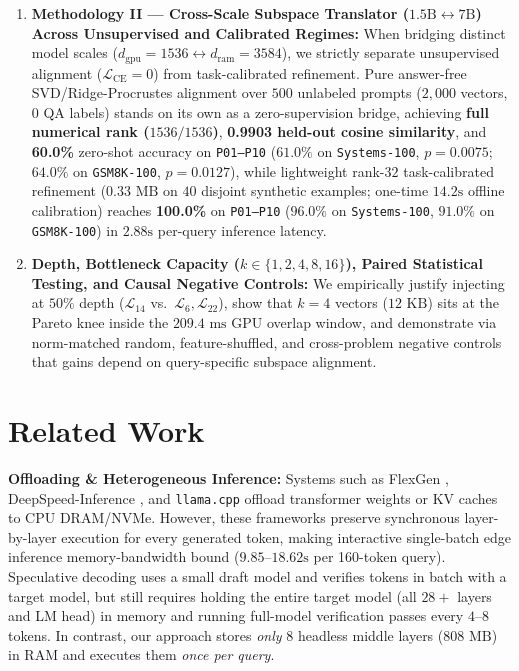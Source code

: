 \documentclass[10pt,twocolumn]{article}
\begin{document}
\begin{enumerate}
    \item \textbf{Methodology II --- Cross-Scale Subspace Translator ($1.5\text{B} \leftrightarrow 7\text{B}$) Across Unsupervised and Calibrated Regimes:} When bridging distinct model scales ($d_{\text{gpu}} = 1536 \leftrightarrow d_{\text{ram}} = 3584$), we strictly separate unsupervised alignment ($\mathcal{L}_{\text{CE}} = 0$) from task-calibrated refinement. Pure answer-free SVD/Ridge-Procrustes alignment over $500$ unlabeled prompts ($2,000$ vectors, $0$ QA labels) stands on its own as a zero-supervision bridge, achieving \textbf{full numerical rank ($1536/1536$)}, \textbf{0.9903 held-out cosine similarity}, and \textbf{60.0\%} zero-shot accuracy on \texttt{P01--P10} ($\mathbf{61.0\%}$ on \texttt{Systems-100}, $p=0.0075$; $\mathbf{64.0\%}$ on \texttt{GSM8K-100}, $p=0.0127$), while lightweight rank-$32$ task-calibrated refinement ($0.33\text{ MB}$ on $40$ disjoint synthetic examples; one-time $14.2\text{s}$ offline calibration) reaches \textbf{100.0\%} on \texttt{P01--P10} ($\mathbf{96.0\%}$ on \texttt{Systems-100}, $\mathbf{91.0\%}$ on \texttt{GSM8K-100}) in $2.88\text{s}$ per-query inference latency.
    \item \textbf{Depth, Bottleneck Capacity ($k \in \{1,2,4,8,16\}$), Paired Statistical Testing, and Causal Negative Controls:} We empirically justify injecting at $50\%$ depth ($\mathcal{L}_{14}$ vs.\ $\mathcal{L}_6, \mathcal{L}_{22}$), show that $k=4$ vectors ($12\text{ KB}$) sits at the Pareto knee inside the $209.4\text{ ms}$ GPU overlap window, and demonstrate via norm-matched random, feature-shuffled, and cross-problem negative controls that gains depend on query-specific subspace alignment.
\end{enumerate}

\section{Related Work}
\textbf{Offloading \& Heterogeneous Inference:} Systems such as FlexGen \cite{sheng2023flexgen}, DeepSpeed-Inference \cite{aminabadi2022deepspeed}, and \texttt{llama.cpp} offload transformer weights or KV caches to CPU DRAM/NVMe. However, these frameworks preserve synchronous layer-by-layer execution for every generated token, making interactive single-batch edge inference memory-bandwidth bound ($9.85\text{--}18.62\text{s}$ per 160-token query). Speculative decoding \cite{leviathan2023fast} uses a small draft model and verifies tokens in batch with a target model, but still requires holding the entire target model (all $28+$ layers and LM head) in memory and running full-model verification passes every $4\text{--}8$ tokens. In contrast, our approach stores \emph{only} $8$ headless middle layers ($808\text{ MB}$) in RAM and executes them \emph{once per query}.
\end{document}
